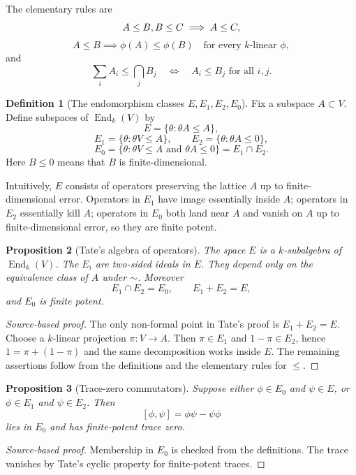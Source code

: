 \documentclass[11pt,a4paper]{article}
\newcommand{\End}{\operatorname{End}}
\theoremstyle{definition}
\newtheorem{definition}{Definition}[section]
\theoremstyle{plain}
\newtheorem{proposition}[definition]{Proposition}
\theoremstyle{remark}
\begin{document}
The elementary rules are
\[
  A\le B,\\ B\le C \implies A\le C,
\]
\[
  A\le B \implies \phi(A)\le \phi(B)\quad\text{for every }k\text{-linear }\phi,
\]
and
\[
  \sum_i A_i\le \bigcap_j B_j
  \quad\Longleftrightarrow\quad
  A_i\le B_j\text{ for all }i,j.
\]

\begin{definition}[The endomorphism classes $E,E_1,E_2,E_0$]
Fix a subspace $A\subset V$.  Define subspaces of $\End_k(V)$ by
\[
  E=\{\theta : \theta A\le A\},
\]
\[
  E_1=\{\theta : \theta V\le A\},\qquad
  E_2=\{\theta : \theta A\le 0\},
\]
\[
  E_0=\{\theta : \theta V\le A\text{ and }\theta A\le 0\}=E_1\cap E_2.
\]
Here $B\le 0$ means that $B$ is finite-dimensional.
\end{definition}

Intuitively, $E$ consists of operators preserving the lattice $A$ up to finite-dimensional error.  Operators in $E_1$ have image essentially inside $A$; operators in $E_2$ essentially kill $A$; operators in $E_0$ both land near $A$ and vanish on $A$ up to finite-dimensional error, so they are finite potent.

\begin{proposition}[Tate's algebra of operators]
The space $E$ is a $k$-subalgebra of $\End_k(V)$.  The $E_i$ are two-sided ideals in $E$.  They depend only on the equivalence class of $A$ under $\sim$.  Moreover
\[
  E_1\cap E_2=E_0,
  \qquad
  E_1+E_2=E,
\]
and $E_0$ is finite potent.
\end{proposition}

\begin{proof}[Source-based proof]
The only non-formal point in Tate's proof is $E_1+E_2=E$.  Choose a $k$-linear projection $\pi\colon V\to A$.  Then $\pi\in E_1$ and $1-\pi\in E_2$, hence $1=\pi+(1-\pi)$ and the same decomposition works inside $E$.  The remaining assertions follow from the definitions and the elementary rules for $\le$.
\end{proof}

\begin{proposition}[Trace-zero commutators]
Suppose either $\phi\in E_0$ and $\psi\in E$, or $\phi\in E_1$ and $\psi\in E_2$.  Then
\[
  [\phi,\psi]=\phi\psi-\psi\phi
\]
lies in $E_0$ and has finite-potent trace zero.
\end{proposition}

\begin{proof}[Source-based proof]
Membership in $E_0$ is checked from the definitions.  The trace vanishes by Tate's cyclic property for finite-potent traces.
\end{proof}
\end{document}
